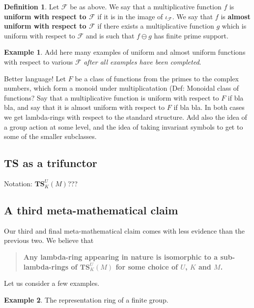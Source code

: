 \documentclass[a4paper]{article}
\theoremstyle{definition}
\newtheorem{definition}{Definition}[section]
\newtheorem{example}{Example}[section]
\theoremstyle{remark}
\newcommand{\TS}{\mathbf{TS}}
\newcommand{\defhl}[1]{\textbf{#1}}
\begin{document}
\begin{definition}
Let $\mathcal{F}$ be as above. We say that a multiplicative function $f$ is \defhl{uniform with respect to $\mathcal{F}$} if it is in the image of $\iota_{\mathcal{F}}$. We say that $f$ is \defhl{almost uniform with respect to $\mathcal{F}$} if there exists a multiplicative function $g$ which is uniform with respect to $\mathcal{F}$ and is such that $f \ominus g$ has finite prime support. 
\end{definition}

\begin{example}
Add here many examples of uniform and almost uniform functions with respect to various $\mathcal{F}$ \emph{after all examples have been completed}.
\end{example}

Better language! Let $F$ be a class of functions from the primes to the complex numbers, which form a monoid under multiplicatation (Def: Monoidal class of functions? Say that a multiplicative function is uniform with respect to $F$ if bla bla, and say that it is almost uniform with respect to $F$ if bla bla. In both cases we get lambda-rings with respect to the standard structure. Add also the idea of a group action at some level, and the idea of taking invariant symbols to get to some of the smaller subclasses.


\subsection{\textbf{TS} as a trifunctor}

Notation: $\TS_K^U(M)$???
\subsection{A third meta-mathematical claim}

Our third and final meta-mathematical claim comes with less evidence than the previous two. We  believe that

\begin{quote}
\textbf{Any lambda-ring appearing in nature is isomorphic to a sub-lambda-rings of $\TS^U_K(M)$ for some choice of $U$, $K$ and $M$.}
\end{quote}


Let us consider a few examples.

\begin{example}
The representation ring of a finite group.  
\end{example}
\end{document}
